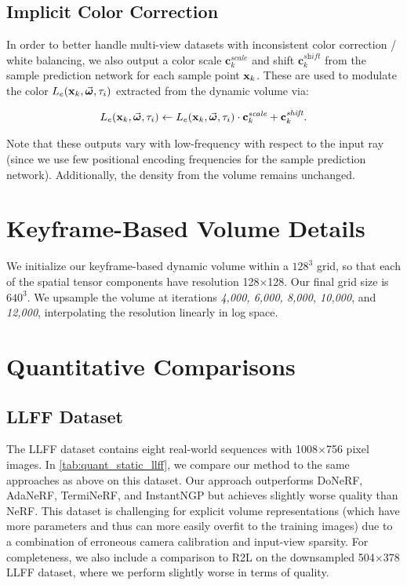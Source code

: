 \documentclass[10pt,twocolumn,letterpaper]{article}
\begin{document}
\subsection{Implicit Color Correction}

In order to better handle multi-view datasets with inconsistent color correction / white balancing, we also output a color scale $\mathbf{c}^{\textit{scale}}_k$ and shift $\mathbf{c}^{\textit{shift}}_k$ from the sample prediction network for each sample point $\mathbf{x}_k$. These are used to modulate the color $L_e(\mathbf{x}_k, \vec{\boldsymbol{\omega}}, \tau_i)$ extracted from the dynamic volume via:

\begin{align}
    L_e(\mathbf{x}_k, \vec{\boldsymbol{\omega}}, \tau_i) \leftarrow L_e(\mathbf{x}_k, \vec{\boldsymbol{\omega}}, \tau_i) \cdot 
 \mathbf{c}^{\textit{scale}}_k + \mathbf{c}^{\textit{shift}}_k \text{.}
    \label{eq:scaleshift}
\end{align}

\noindent Note that these outputs vary with low-frequency with respect to the input ray (since we use few positional encoding frequencies for the sample prediction network). Additionally, the density from the volume remains unchanged. 


\section{Keyframe-Based Volume Details}
\label{sec:keyframe_details}

We initialize our keyframe-based dynamic volume within a $128^{3}$ grid, so that each of the spatial tensor components have resolution 128$\times$128. Our final grid size is $640^{3}$. We upsample the volume at iterations \textit{4,000, 6,000, 8,000, 10,000}, and \textit{12,000}, interpolating the resolution linearly in log space.

\section{Quantitative Comparisons}
\label{sec:additional_comparisons}

\subsection{LLFF Dataset}
The LLFF dataset \cite{MildeSTBRN2020} contains eight real-world sequences with 1008$\times$756 pixel images.
In \cref{tab:quant_static_llff}, we compare our method to the same approaches as above on this dataset.
Our approach outperforms DoNeRF, AdaNeRF, TermiNeRF, and InstantNGP but achieves slightly worse quality than NeRF.
This dataset is challenging for explicit volume representations (which have more parameters and thus can more easily overfit to the training images) due to a combination of erroneous camera calibration and input-view sparsity.
For completeness, we also include a comparison to R2L on the downsampled 504$\times$378 LLFF dataset, where we perform slightly worse in terms of quality.
\end{document}
